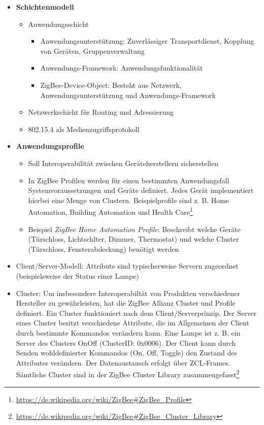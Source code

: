 \begin{itemize}
\begin{itemize}
		\item \textbf{Schichtenmodell}
		\begin{itemize}
			\item Anwendungsschicht
			\begin{itemize}
				\item Anwendungsunterstützung: Zuverlässiger Transportdienst, Kopplung von Geräten, Gruppenverwaltung
				\item Anwendungs-Framework: Anwendungsfunktionalität
				\item ZigBee-Device-Object: Besteht aus Netzwerk, Anwendungsunterstützung und Anwendungs-Framework
			\end{itemize}
			\item Netzwerkschicht für Routing und Adressierung
			\item 802.15.4 als Medienzugriffsprotokoll
		\end{itemize}
		\item \textbf{Anwendungsprofile}
		\begin{itemize}
			\item Soll Interoperabilität zwischen Geräteherstellern sicherstellen
			\item In ZigBee Profilen werden für einen bestimmten Anwendungsfall Systemvoraussetzungen und Geräte definiert. Jedes Gerät implementiert hierbei eine Menge von Clustern. Beispielprofile sind z. B. Home Automation, Building Automation und Health Care\footnote{\url{https://de.wikipedia.org/wiki/ZigBee\#ZigBee_Profile}}
			\item Beispiel \textit{ZigBee Home Automation Profile}: Beschreibt welche Geräte (Türschloss, Lichtschlter, Dimmer, Thermostat) und welche Cluster (Türschloss, Fensterabdeckung) benötigt werden
		\end{itemize}
		\item Client/Server-Modell: Attribute sind typischerweise Servern zugeordnet (beispielsweise der Status einer Lampe)
		\item Cluster: Um insbesondere Interoperabiltät von Produkten verschiedener Hersteller zu gewährleisten, hat die ZigBee Allianz Cluster und Profile definiert. Ein Cluster funktioniert nach dem Client/Serverprinzip. Der Server eines Cluster besitzt verschiedene Attribute, die im Allgemeinen der Client durch bestimmte Kommandos verändern kann. Eine Lampe ist z. B. ein Server des Clusters OnOff (ClusterID: 0x0006). Der Client kann durch Senden wohldefinierter Kommandos (On, Off, Toggle) den Zustand des Attributes verändern. Der Datenaustausch erfolgt über ZCL-Frames. Sämtliche Cluster sind in der ZigBee Cluster Library zusammengefasst\footnote{\url{https://de.wikipedia.org/wiki/ZigBee\#ZigBee_Cluster_Library}}

\end{itemize}
\end{itemize}
